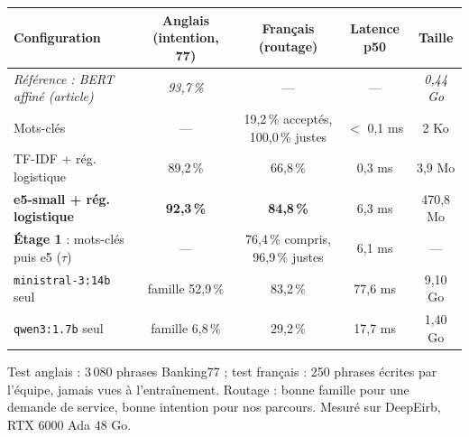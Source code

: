 \scriptsize
\begin{tabularx}{\textwidth}{@{}Y c c c c@{}}
\toprule
\textbf{Configuration} & \textbf{Anglais (intention, 77)} & \textbf{Français (routage)} & \textbf{Latence p50} & \textbf{Taille} \\
\midrule
\textit{Référence : BERT affiné (article)} & \textit{93,7\,\%} & --- & --- & \textit{0,44 Go} \\
Mots-clés & --- & 19,2\,\% acceptés, 100,0\,\% justes & $<$ 0,1 ms & 2 Ko \\
TF-IDF + rég. logistique & 89,2\,\% & 66,8\,\% & 0,3 ms & 3,9 Mo \\
\textbf{e5-small + rég. logistique} & \textbf{92,3\,\%} & \textbf{84,8\,\%} & 6,3 ms & 470,8 Mo \\
\textbf{Étage 1} : mots-clés puis e5 ($\tau$) & --- & 76,4\,\% compris, 96,9\,\% justes & 6,1 ms & --- \\
\texttt{ministral-3:14b} seul & famille 52,9\,\% & 83,2\,\% & 77,6 ms & 9,10 Go \\
\texttt{qwen3:1.7b} seul & famille 6,8\,\% & 29,2\,\% & 17,7 ms & 1,40 Go \\
\bottomrule
\end{tabularx}

\smallskip
{\tiny Test anglais : 3\,080 phrases Banking77 ; test français : 250 phrases écrites par l'équipe, jamais vues à l'entraînement. Routage : bonne famille pour une demande de service, bonne intention pour nos parcours. Mesuré sur DeepEirb, RTX 6000 Ada 48 Go.}
